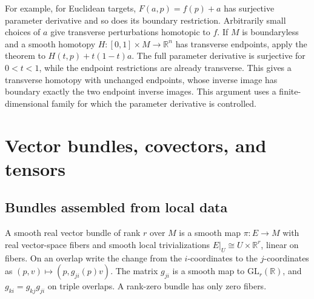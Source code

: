 \documentclass[11pt,oneside,openany]{book}
\theoremstyle{definition}
\theoremstyle{remark}
\newcommand{\R}{\mathbb R}
\begin{document}
For example, for Euclidean targets, \(F(a,p)=f(p)+a\) has surjective parameter derivative and so does its boundary restriction. Arbitrarily small choices of \(a\) give transverse perturbations homotopic to \(f\). If \(M\) is boundaryless and a smooth homotopy \(H:[0,1]\times M\to\R^n\) has transverse endpoints, apply the theorem to \(H(t,p)+t(1-t)a\). The full parameter derivative is surjective for \(0<t<1\), while the endpoint restrictions are already transverse. This gives a transverse homotopy with unchanged endpoints, whose inverse image has boundary exactly the two endpoint inverse images. This argument uses a finite-dimensional family for which the parameter derivative is controlled.
\chapter{Vector bundles, covectors, and tensors}

\section{Bundles assembled from local data}

A smooth real vector bundle of rank \(r\) over \(M\) is a smooth map \(\pi:E\to M\) with real vector-space fibers and smooth local trivializations \(E|_U\cong U\times\R^r\), linear on fibers. On an overlap write the change from the \(i\)-coordinates to the \(j\)-coordinates as \((p,v)\mapsto(p,g_{ji}(p)v)\). The matrix \(g_{ji}\) is a smooth map to \(\mathrm{GL}_r(\R)\), and \(g_{ki}=g_{kj}g_{ji}\) on triple overlaps. A rank-zero bundle has only zero fibers.
\end{document}

